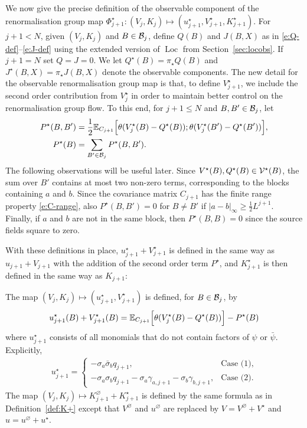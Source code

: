 \documentclass[11pt]{amsart}
\numberwithin{equation}{section}
\numberwithin{theorem}{section}
\newcommand{\1}{{\bf 1}}
\newcommand{\obs}{\star}
\newcommand{\Vobs}{V^\obs}
\newcommand{\uobs}{u^\obs}
\newcommand{\Kbulk}{K^\varnothing}
\newcommand{\Kobs}{K^\obs}
\newcommand{\Loc}{\operatorname{Loc}}
\begin{document}
We now give the precise definition of the observable component
of the renormalisation group map
$\Phi_{j+1}^\obs\colon (V_j,K_j)\mapsto (\uobs_{j+1}, \Vobs_{j+1}, \Kobs_{j+1})$.
For $j+1<N$, given $(V_j, K_j)$ and $B \in \mathcal B_j$,
define $Q(B)$ and $J(B,X)$ as in
\eqref{e:Q-def}--\eqref{e:J-def} using the extended version of
$\Loc$ from Section~\ref{sec:locobs}. If $j+1=N$ set $Q=J=0$.
We let $Q^\obs(B)=\pi_\obs Q(B) $ and $J^\obs(B,X)=\pi_\obs J(B, X)$ denote
the observable components.  The new detail for the observable renormalisation group map
is that, to define $\Vobs_{j+1}$, we include the second order
contribution from $\Vobs_{j}$ in order to maintain better control on
the renormalisation group flow.  To this end, for $j+1\leq N$
and $B,B'\in\mathcal B_{j}$, let 
\begin{equation} \label{e:Pobs-def}
  \begin{split}
    P^\obs(B,B')
    &=
    \frac12
      \E_{C_{j+1}}\qB{\theta (\Vobs_j(B)-Q^\obs(B)); \theta (\Vobs_j(B')-Q^\obs(B'))},
    \\
    P^\obs(B)
    &= \sum_{B' \in \cB_j} P^{\obs}(B,B')
    .
  \end{split}
\end{equation}
%
The following observations will be useful later. Since
$V^\obs(B), Q^\obs(B) \in \cV^\obs(B)$, the sum over $B'$ contains at
most two non-zero terms, corresponding to the blocks
containing $a$ and $b$.  Since the covariance matrix $C_{j+1}$ has the
finite range property \eqref{e:C-range}, also $P^\obs(B,B')=0$ for
$B\neq B'$ if $|a-b|_\infty \geq \frac12 L^{j+1}$.  Finally, if $a$
and $b$ are not in the same block, then $P^\obs(B,B)=0$ since
the source fields square to zero.

With these definitions in place, $ \uobs_{j+1}+\Vobs_{j+1}$ is defined
in the same way as $ u_{j+1}+ V_{j+1}$ with the addition of the second
order term $P^\obs$, and $\Kobs_{j+1}$ is then defined in the same way
as $K_{j+1}$:
%
%
%
\begin{definition} \label{def:V+obs}
The map $(V_j,K_j) \mapsto ({ \uobs_{j+1}},\Vobs_{j+1})$ is defined, for $B\in \mathcal B_j$, by
\begin{equation}
  \label{E:Qobs}
  \uobs_{j+1}(B)+
  \Vobs_{j+1}(B) = 
  \E_{C_{j+1}}\qB{\theta (\Vobs_j(B) - Q^\obs(B))} - P^\obs(B)
\end{equation}
where $\uobs_{j+1}$ consists of
all monomials that do not contain factors of
$\psi$ or $\bar\psi$. Explicitly,
  \begin{align}
    \uobs_{j+1}=
    \begin{cases}
      -\sigma_a\bar\sigma_b q_{j+1}, &\text{Case (1)}, \\ 
    -\sigma_a\sigma_b q_{j+1} - \sigma_a \gamma_{a,j+1}
    -\sigma_b\gamma_{b,j+1}, &\text{Case (2)}.
    \end{cases}
  \end{align}
%
The map $(V_j,K_j)\mapsto \Kbulk_{j+1}+\Kobs_{j+1}$ is defined by the same formula
as in Definition~\ref{def:K+} except that $V^\varnothing$ and $u^\varnothing$
are replaced by 
$V=V^\varnothing+V^\obs$ and $u=u^\varnothing+u^\obs$.
\end{definition}
\end{document}
